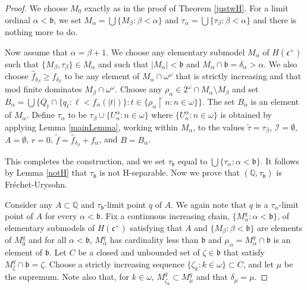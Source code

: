 \documentclass[10pt,a4paper]{amsart}
\begin{document}
\begin{proof}
We choose $M_0$ exactly as in the proof of
 Theorem \ref{justwH}. For a limit ordinal $\alpha < \mathfrak b$,
   we set $ M_\alpha = \bigcup\{ M_\beta : \beta < \alpha\}$ and
      $\tau_\alpha = \bigcup\{ \tau_\beta : \beta < \alpha\}$ and there
      is nothing more to do.

      Now assume that $\alpha = \beta+1$.  
We choose   any elementary submodel $M_\alpha$ of $H(\mathfrak c^+)$
such that $ \{M_\beta , \tau_\beta\}\in M_\alpha$
 and such that $|M_\alpha | < \mathfrak b$
and $M_\alpha\cap \mathfrak b =\delta_\alpha>\alpha$. 
We also choose $\hat f_{\delta_\beta}\geq f_{\delta_\beta}$
to be any element
of $M_\alpha\cap \omega^\omega$ that is strictly increasing
and that mod finite dominates
 $M_\beta\cap \omega^\omega$.
Choose any $\rho_\alpha \in  2^\omega\cap M_\alpha \setminus M_\beta$ 
and set  $B_\alpha =
\bigcup\{ Q_t \cap \{ q_\ell : \ell < f_\alpha(|t|) \}: 
  t\in \{ \rho_\alpha\restriction n : n\in \omega\}\}$.
  The set $B_\alpha$ is an element of $M_\alpha$.  
  Define
  $\tau_\alpha$ to be $\tau_\beta \cup
  \{U^\alpha_n : n\in \omega\}$ where $\{U^\alpha_n : n\in\omega\}$
  is obtained by applying Lemma \ref{mainLemma}, working within
   $M_\alpha$, to the
  values $\tilde\tau = \tau_\beta$,
  $\mathcal I = \emptyset$,
   $A=\emptyset$, $r=0$, $\tilde f = \hat f_{\delta_\beta}+f_\alpha  $, and
    $B = B_\alpha$.  
    
     
This completes the construction, and we set $\tau_{\mathfrak b}$
equal to $\bigcup\{ \tau_\alpha : \alpha < \mathfrak b\}$.  
 It follows by Lemma \ref{notH} that $\tau_{\mathfrak b}$ is not
  H-separable. Now
we prove that $(\mathbb Q, \tau_{\mathfrak b})$ is 
 Fr\'echet-Urysohn.  
 
 
 Consider any $A\subset \mathbb Q$
 and $\tau_{\mathfrak b}$-limit point $q$ of $A$.   
 We again note that $q$ is a $\tau_\alpha$-limit point 
 of $A$ for every $\alpha < \mathfrak b$. 
Fix a continuous increasing chain, $\{ M^q_\alpha : \alpha < \mathfrak b\}$,
   of elementary submodels of $H(\mathfrak c^+)$ satisfying that
   $A$ and 
     $\{ M_\beta: \beta < \mathfrak b\}$ are elements of $ M^q_0$ and for all
      $\alpha<\mathfrak b$, $M^q_\alpha$ has cardinality less
      than $\mathfrak b$ and $\mu_\alpha = M^q_\alpha\cap \mathfrak b$
      is an element of $\mathfrak b$.  Let $C$ be a closed 
      and unbounded set of $\zeta\in \mathfrak b$ that satisfy
       $M^q_\zeta \cap \mathfrak b = \zeta$. Choose a strictly
       increasing sequence $\{ \zeta_k : k\in\omega\}\subset C$,
        and let $\mu$ be the supremum. Note also that, for $k\in\omega$,
         $M^q_{\zeta_k}\subset M^q_\mu$ and that 
        $\delta_\mu = \mu$.


\end{proof}
\end{document}
